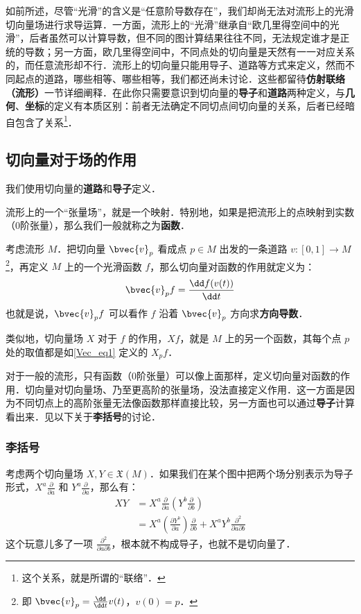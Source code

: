 如前所述，尽管“光滑”的含义是“任意阶导数存在”，我们却尚无法对流形上的光滑切向量场进行求导运算．一方面，流形上的“光滑”继承自“欧几里得空间中的光滑”，后者虽然可以计算导数，但不同的图计算结果往往不同，无法规定谁才是正统的导数；另一方面，欧几里得空间中，不同点处的切向量是天然有一一对应关系的，而任意流形却不行．流形上的切向量只能用导子、道路等方式来定义，然而不同起点的道路，哪些相等、哪些相等，我们都还尚未讨论．这些都留待\textbf{仿射联络（流形）}一节详细阐释．在此你只需要意识到切向量的\textbf{导子}和\textbf{道路}两种定义，与\textbf{几何}、\textbf{坐标}的定义有本质区别：前者无法确定不同切点间切向量的关系，后者已经暗自包含了关系\footnote{这个关系，就是所谓的“联络”．}．


\subsection{切向量对于场的作用}
我们使用切向量的\textbf{道路}和\textbf{导子}定义．

流形上的一个“张量场”，就是一个映射．特别地，如果是把流形上的点映射到实数（0阶张量），那么我们一般就称之为\textbf{函数}．

考虑流形 $M$．把切向量 $\bvec{v}_p$ 看成点 $p\in M$ 出发的一条道路 $v:[0, 1]\to M$\footnote{即 $\bvec{v}_p=\frac{\dd}{\dd t}v(t)$，$v(0)=p$．}，再定义 $M$ 上的一个光滑函数 $f$，那么切向量对函数的作用就定义为：
\begin{equation}\label{Vec_eq1}
\bvec{v}_pf=\frac{\dd f(v(t))}{\dd t}
\end{equation}
也就是说，$\bvec{v}_pf$ 可以看作 $f$ 沿着 $\bvec{v}_p$ 方向求\textbf{方向导数}．

类似地，切向量场 $X$ 对于 $f$ 的作用，$Xf$，就是 $M$ 上的另一个函数，其每个点 $p$ 处的取值都是如\autoref{Vec_eq1} 定义的 $X_p f$．

对于一般的流形，只有函数（0阶张量）可以像上面那样，定义切向量对函数的作用．切向量对切向量场、乃至更高阶的张量场，没法直接定义作用．这一方面是因为不同切点上的高阶张量无法像函数那样直接比较，另一方面也可以通过\textbf{导子}计算看出来．见以下关于\textbf{李括号}的讨论．

\subsubsection{李括号}

考虑两个切向量场 $X, Y\in\mathfrak{X}(M)$．如果我们在某个图中把两个场分别表示为导子形式，$X^a\frac{\partial}{\partial a}$ 和 $Y^a\frac{\partial}{\partial a}$，那么有：
\begin{equation}
\begin{aligned}
XY&=X^a\frac{\partial}{\partial a}(Y^b\frac{\partial}{\partial b})\\
&=X^a(\frac{\partial Y^b}{\partial a})\frac{\partial}{\partial b}+X^aY^b\frac{\partial^2}{\partial a\partial b}
\end{aligned}
\end{equation}
这个玩意儿多了一项 $\frac{\partial^2}{\partial a\partial b}$，根本就不构成导子，也就不是切向量了．

